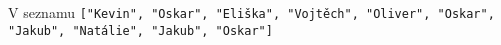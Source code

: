 \question[50]
V seznamu \texttt{["Kevin", "Oskar", "Eliška", "Vojtěch", "Oliver", "Oskar",
			"Jakub", "Natálie", "Jakub", "Oskar"]}
\begin{enumerate}

\end{enumerate}